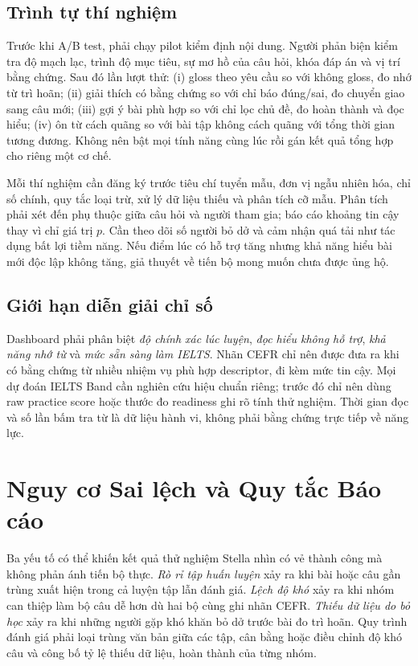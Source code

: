 \documentclass[conference,10pt]{IEEEtran}
\begin{document}
\subsection{Trình tự thí nghiệm}
Trước khi A/B test, phải chạy pilot kiểm định nội dung. Người phản biện kiểm tra độ mạch lạc, trình độ mục tiêu, sự mơ hồ của câu hỏi, khóa đáp án và vị trí bằng chứng. Sau đó lần lượt thử: (i) gloss theo yêu cầu so với không gloss, đo nhớ từ trì hoãn; (ii) giải thích có bằng chứng so với chỉ báo đúng/sai, đo chuyển giao sang câu mới; (iii) gợi ý bài phù hợp so với chỉ lọc chủ đề, đo hoàn thành và đọc hiểu; (iv) ôn từ cách quãng so với bài tập không cách quãng với tổng thời gian tương đương. Không nên bật mọi tính năng cùng lúc rồi gán kết quả tổng hợp cho riêng một cơ chế.

Mỗi thí nghiệm cần đăng ký trước tiêu chí tuyển mẫu, đơn vị ngẫu nhiên hóa, chỉ số chính, quy tắc loại trừ, xử lý dữ liệu thiếu và phân tích cỡ mẫu. Phân tích phải xét đến phụ thuộc giữa câu hỏi và người tham gia; báo cáo khoảng tin cậy thay vì chỉ giá trị $p$. Cần theo dõi số người bỏ dở và cảm nhận quá tải như tác dụng bất lợi tiềm năng. Nếu điểm lúc có hỗ trợ tăng nhưng khả năng hiểu bài mới độc lập không tăng, giả thuyết về tiến bộ mong muốn chưa được ủng hộ.

\subsection{Giới hạn diễn giải chỉ số}
Dashboard phải phân biệt \emph{độ chính xác lúc luyện}, \emph{đọc hiểu không hỗ trợ}, \emph{khả năng nhớ từ} và \emph{mức sẵn sàng làm IELTS}. Nhãn CEFR chỉ nên được đưa ra khi có bằng chứng từ nhiều nhiệm vụ phù hợp descriptor, đi kèm mức tin cậy. Mọi dự đoán IELTS Band cần nghiên cứu hiệu chuẩn riêng; trước đó chỉ nên dùng raw practice score hoặc thước đo readiness ghi rõ tính thử nghiệm. Thời gian đọc và số lần bấm tra từ là dữ liệu hành vi, không phải bằng chứng trực tiếp về năng lực.


\section{Nguy cơ Sai lệch và Quy tắc Báo cáo}
Ba yếu tố có thể khiến kết quả thử nghiệm Stella nhìn có vẻ thành công mà không phản ánh tiến bộ thực. \emph{Rò rỉ tập huấn luyện} xảy ra khi bài hoặc câu gần trùng xuất hiện trong cả luyện tập lẫn đánh giá. \emph{Lệch độ khó} xảy ra khi nhóm can thiệp làm bộ câu dễ hơn dù hai bộ cùng ghi nhãn CEFR. \emph{Thiếu dữ liệu do bỏ học} xảy ra khi những người gặp khó khăn bỏ dở trước bài đo trì hoãn. Quy trình đánh giá phải loại trùng văn bản giữa các tập, cân bằng hoặc điều chỉnh độ khó câu và công bố tỷ lệ thiếu dữ liệu, hoàn thành của từng nhóm.
\end{document}
